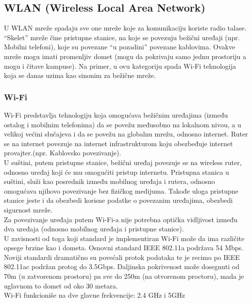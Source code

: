 \documentclass[a4paper]{article}
\begin{document}
    \subsection{WLAN (Wireless Local Area Network)}
U WLAN mreže spadaju sve one mreže koje za komunikaciju koriste radio talase. “Skelet” mreže čine pristupne stanice, na koje se povezuju bežični uređaji (npr. Mobilni telefoni), koje su povezane “u pozadini” povezane kablovima. Ovakve mreže mogu imati promenljiv domet (mogu da pokrivaju samo jednu prostoriju a mogu i čitave kampuse). Na primer, u ovu kategoriju spada Wi-Fi tehnologija koja se danas uzima kao sinonim za bežične mreže.
        \subsubsection{Wi-Fi}
Wi-Fi predstavlja tehnologiju koja omogućava bežičnim uređajima (između ostalog i mobilnim telefonima) da se povežu međusobno na lokalnom nivou, a u velikoj većini slučajeva i da se povežu na globalnu mrežu, odnosno internet. Ruter se na internet povezuje na internet infrastrukturom koju obezbeđuje internet provajter.(npr. Kablovsko povezivanje).\\
U suštini, putem pristupne stanice, bežični uređaj povezuje se na wireless ruter, odnosno uređaj koji će mu omogućiti pristup internetu. Pristupna stanica u suštini, služi kao posrednik između mobilnog uređaja i rutera, odnosno omogućava njihovo povezivanje bez fizičkog medijuma. Takođe uloga pristupne stanice jeste i da obezbedi korisne podatke o povezanim uređajima, obezbedi sigurnost mreže.\\
Za povezivanje uređaja putem Wi-Fi-a nije potrebna optička vidljivost između dva uređaja (odnosno mobilnog uređaja i pristupne stanice).\\
U zavisnosti od toga koji standard je implementiran Wi-Fi može da ima različite opsege brzine kao i dometa. Osnovni standard IEEE 802.11a podržava 54 Mbps. Noviji standardi dramatično su povećali protok podataka te je recimo po IEEE 802.11ac podržan protog do 3.5Gbps. Daljinska pokrivenost može dosegnuti od 70m (u zatvorenom prostoru) pa sve do 250m (na otvorenom proctoru), mada je uglavnom to domet od oko 30 metara. \cite{wireless} \\
Wi-Fi funkcioniše na dve glavne frekvencije: 2.4 GHz i 5GHz \\
\end{document}
